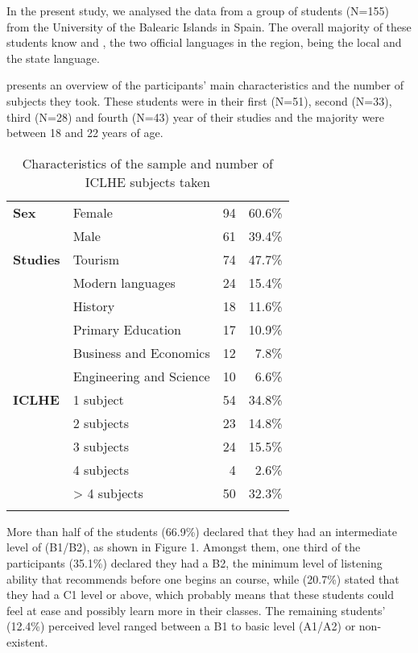 \documentclass[output=paper]{langsci/langscibook}
\begin{document}
In the present study, we analysed the data from a group of students (N=155) from the University of the Balearic Islands in Spain. The overall majority of these students know  and , the two official languages in the region,  being the local and  the state language. 


\newpage 
{} presents an overview of the participants' main characteristics and the number of  subjects they took. These students were in their first (N=51), second (N=33), third (N=28) and fourth (N=43) year of their studies and the majority were between 18 and 22 years of age. 


\begin{table}
\caption{Characteristics of the sample and number of ICLHE subjects taken}
\label{tab:moratinos:1}

\begin{tabularx}{\textwidth}{lQrr}
\lsptoprule
{} & \\
 \midrule
 \textbf{Sex}  & Female & 94 & 60.6\%\\
& Male & 61 & 39.4\%\\
\tablevspace
 \textbf{Studies}  & Tourism & 74 & 47.7\%\\
& Modern languages & 24 & 15.4\%\\
& History & 18 & 11.6\%\\
& Primary Education & 17 & 10.9\%\\
& Business and Economics & 12 & 7.8\%\\
& Engineering and Science\par & 10 & 6.6\%\\
 \textbf{ICLHE}  & 1 subject & 54 & 34.8\%\\
& 2 subjects & 23 & 14.8\%\\
& 3 subjects & 24 & 15.5\%\\
& 4 subjects & 4 & 2.6\%\\
& > 4 subjects & 50 & 32.3\%\\
\lspbottomrule
\end{tabularx}
\end{table}

More than half of the students (66.9\%) declared that they had an intermediate level of  (B1/B2), as shown in Figure 1. Amongst them, one third of the participants (35.1\%) declared they had a B2, the minimum level of listening ability that \citet{Breeze2014} recommends before one begins an  course, while (20.7\%) stated that they had a C1 level or above, which probably means that these students could feel at ease and possibly learn more in their classes. The remaining students’ (12.4\%) perceived level ranged between a B1 to basic level (A1/A2) or non-existent. 
\end{document}
